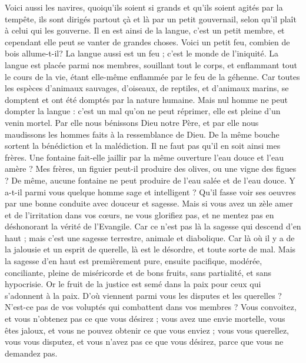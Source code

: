 \begin{multicols}{2}
Voici aussi les navires, quoiqu'ils soient si grands et qu'ils soient agités par la tempête, ils sont dirigés partout çà et là par un petit gouvernail, selon qu'il plaît à celui qui les gouverne.
Il en est ainsi de la langue, c'est un petit membre, et cependant elle peut se vanter de grandes choses. Voici un petit feu, combien de bois allume-t-il?
La langue aussi est un feu ; c'est le monde de l'iniquité. La langue est placée parmi nos membres, souillant tout le corps, et enflammant tout le cours de la vie, étant elle-même enflammée par le feu de la géhenne.
Car toutes les espèces d'animaux sauvages, d'oiseaux, de reptiles, et d'animaux marins, se domptent et ont été domptés par la nature humaine.
Mais nul homme ne peut dompter la langue : c'est un mal qu'on ne peut réprimer, elle est pleine d'un venin mortel.
Par elle nous bénissons Dieu notre Père, et par elle nous maudissons les hommes faits à la ressemblance de Dieu.
De la même bouche sortent la bénédiction et la malédiction. Il ne faut pas qu'il en soit ainsi mes frères.
Une fontaine fait-elle jaillir par la même ouverture l'eau douce et l'eau amère ?
Mes frères, un figuier peut-il produire des olives, ou une vigne des figues ? De même, aucune fontaine ne peut produire de l'eau salée et de l'eau douce.
Y a-t-il parmi vous quelque homme sage et intelligent ? Qu'il fasse voir ses oeuvres par une bonne conduite avec douceur et sagesse.
Mais si vous avez un zèle amer et de l'irritation dans vos cœurs, ne vous glorifiez pas, et ne mentez pas en déshonorant la vérité de l'Evangile.
Car ce n'est pas là la sagesse qui descend d'en haut ; mais c'est une sagesse terrestre, animale et diabolique.
Car là où il y a de la jalousie et un esprit de querelle, là est le désordre, et toute sorte de mal.
Mais la sagesse d'en haut est premièrement pure, ensuite pacifique, modérée, conciliante, pleine de miséricorde et de bons fruits, sans partialité, et sans hypocrisie.
Or le fruit de la justice est semé dans la paix pour ceux qui s'adonnent à la paix.
\VerseOne{}D'où viennent parmi vous les disputes et les querelles ? N'est-ce pas de vos voluptés qui combattent dans vos membres ?
Vous convoitez, et vous n'obtenez pas ce que vous désirez ; vous avez une envie mortelle, vous êtes jaloux, et vous ne pouvez obtenir ce que vous enviez ; vous vous querellez, vous vous disputez, et vous n'avez pas ce que vous désirez, parce que vous ne demandez pas.

\end{multicols}
